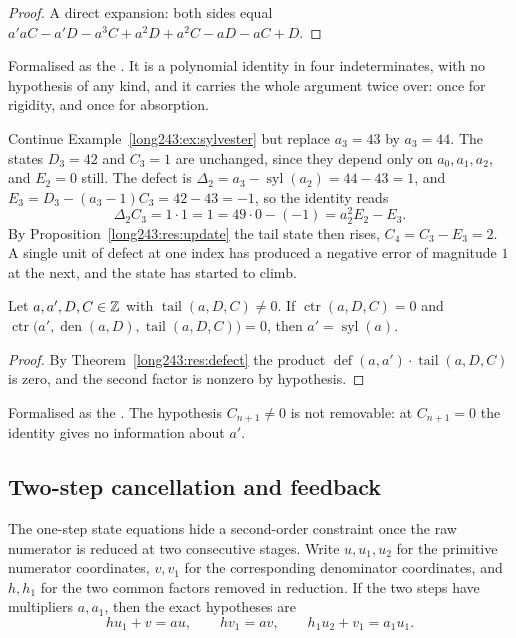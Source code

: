 \documentclass[11pt]{article}
\newcommand{\sylnext}{\operatorname{syl}}
\newcommand{\den}{\operatorname{den}}
\newcommand{\tail}{\operatorname{tail}}
\newcommand{\ctr}{\operatorname{ctr}}
\newcommand{\defect}{\operatorname{def}}
\begin{document}
\begin{proof}
A direct expansion: both sides equal
$a'aC-a'D-a^{3}C+a^{2}D+a^{2}C-aD-aC+D$.
\end{proof}

\noindent Formalised as the
.  It is a polynomial identity in four indeterminates, with no
hypothesis of any kind, and it carries the whole argument twice over: once for
rigidity, and once for absorption.

\begin{example}\label{long243:ex:defect}
Continue Example~\ref{long243:ex:sylvester} but replace $a_3=43$ by $a_3=44$.  The
states $D_3=42$ and $C_3=1$ are unchanged, since they depend only on
$a_0,a_1,a_2$, and $E_2=0$ still.  The defect is
$\Delta_2=a_3-\sylnext(a_2)=44-43=1$, and
$E_3=D_3-(a_3-1)C_3=42-43=-1$, so the identity reads
\[
 \Delta_2C_3=1\cdot1=1=49\cdot0-(-1)=a_2^{2}E_2-E_3 .
\]
By Proposition~\ref{long243:res:update} the tail state then rises, $C_4=C_3-E_3=2$.  A
single unit of defect at one index has produced a negative error of magnitude
$1$ at the next, and the state has started to climb.
\end{example}

\begin{theorem}\label{long243:res:step}
Let $a,a',D,C\in\mathbb{Z}$ with $\tail(a,D,C)\ne0$.  If
$\ctr(a,D,C)=0$ and $\ctr\bigl(a',\den(a,D),\tail(a,D,C)\bigr)=0$, then
$a'=\sylnext(a)$.
\end{theorem}

\begin{proof}
By Theorem~\ref{long243:res:defect} the product $\defect(a,a')\cdot\tail(a,D,C)$ is
zero, and the second factor is nonzero by hypothesis.
\end{proof}

\noindent Formalised as the
.  The hypothesis $C_{n+1}\ne0$ is not removable: at $C_{n+1}=0$
the identity gives no information about $a'$.

\subsection{Two-step cancellation and feedback}

The one-step state equations hide a second-order constraint once the raw
numerator is reduced at two consecutive stages.  Write $u,u_1,u_2$ for the
primitive numerator coordinates, $v,v_1$ for the corresponding denominator
coordinates, and $h,h_1$ for the two common factors removed in reduction.  If
the two steps have multipliers $a,a_1$, then the exact hypotheses are
\[
 hu_1+v=au,\qquad hv_1=av,\qquad
 h_1u_2+v_1=a_1u_1.
\]
\end{document}
